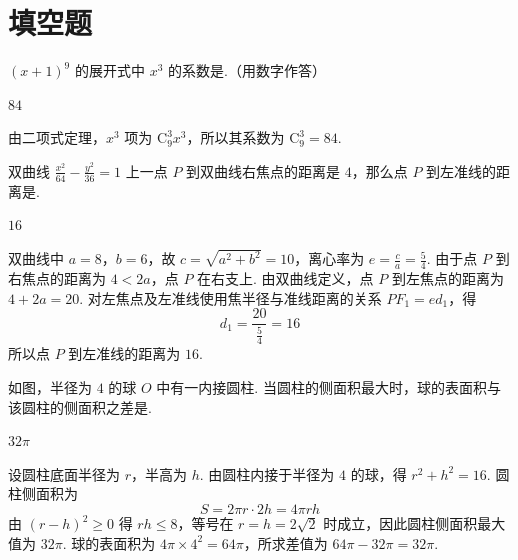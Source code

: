 \section{填空题}

\begin{problem}
\((x + 1)^9\) 的展开式中 \(x^3\) 的系数是\fillinblank{}.（用数字作答）
\end{problem}

\begin{answer}
\(84\)
\end{answer}

\begin{solution}
由二项式定理，\(x^3\) 项为 \(\mathrm C_9^3x^3\)，所以其系数为 \(\mathrm C_9^3=84\).
\end{solution}

\begin{problem}
双曲线 \(\frac{x^2}{64} - \frac{y^2}{36} = 1\) 上一点 \(P\) 到双曲线右焦点的距离是 \(4\)，那么点 \(P\) 到左准线的距离是\fillinblank{}.
\end{problem}

\begin{answer}
\(16\)
\end{answer}

\begin{solution}
双曲线中 \(a=8\)，\(b=6\)，故 \(c=\sqrt{a^2+b^2}=10\)，离心率为 \(e=\frac ca=\frac54\). 由于点 \(P\) 到右焦点的距离为 \(4<2a\)，点 \(P\) 在右支上. 由双曲线定义，点 \(P\) 到左焦点的距离为 \(4+2a=20\). 对左焦点及左准线使用焦半径与准线距离的关系 \(PF_1=e d_1\)，得
\[
d_1=\frac{20}{\frac{5}{4}}=16
\]
所以点 \(P\) 到左准线的距离为 \(16\).
\end{solution}

\begin{problem}
如图，半径为 \(4\) 的球 \(O\) 中有一内接圆柱. 当圆柱的侧面积最大时，球的表面积与该圆柱的侧面积之差是\fillinblank{}.

\end{problem}

\begin{answer}
\(32\pi\)
\end{answer}

\begin{solution}
设圆柱底面半径为 \(r\)，半高为 \(h\). 由圆柱内接于半径为 \(4\) 的球，得 \(r^2+h^2=16\). 圆柱侧面积为
\[
S=2\pi r\cdot2h=4\pi rh
\]
由 \((r-h)^2\geqslant0\) 得 \(rh\leqslant8\)，等号在 \(r=h=2\sqrt2\) 时成立，因此圆柱侧面积最大值为 \(32\pi\). 球的表面积为 \(4\pi\times4^2=64\pi\)，所求差值为 \(64\pi-32\pi=32\pi\).
\end{solution}


